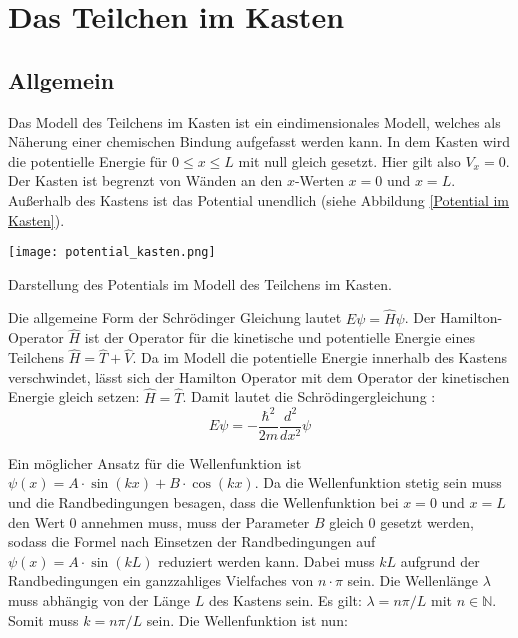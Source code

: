 \section{Das Teilchen im Kasten}

\subsection{Allgemein}

Das Modell des Teilchens im Kasten ist ein eindimensionales Modell, welches als Näherung einer chemischen Bindung aufgefasst werden kann. In dem Kasten wird die potentielle Energie für $ 0 \leq x \leq L $ mit null gleich gesetzt.
Hier gilt also $ V_x = 0 $. 
Der Kasten ist begrenzt von Wänden an den $ x $-Werten $ x = 0 $ und $ x=L $. Außerhalb des Kastens ist das Potential unendlich (siehe Abbildung \ref{Potential im Kasten}).


\begin{dsafigure}
 \centering
 \texttt{[image: potential\_kasten.png]}
 \caption{Darstellung des Potentials im Modell des Teilchens im Kasten.
\cite{wikiKastenpot}}
 \label{Potential im Kasten}
\end{dsafigure} 

Die allgemeine Form der Schrödinger Gleichung lautet $ E\psi=\hat{H}\psi $. Der Hamilton-Operator $ \hat{H} $ ist der Operator für die kinetische und potentielle Energie eines Teilchens $ \hat{H}=\hat{T}+\hat{V} $. Da im Modell die potentielle Energie innerhalb des Kastens verschwindet, lässt sich der Hamilton Operator mit dem Operator der kinetischen Energie gleich setzen: $ \hat{H}=\hat{T} $. Damit lautet die Schrödingergleichung \cite{Atkins2001}:
\begin{equation}
E \psi = - \dfrac{\hbar ^2}{2m} \dfrac{d^2}{dx^2}\psi  
\end{equation}
 

Ein möglicher Ansatz für die Wellenfunktion ist $ \psi (x) = A \cdot \sin (kx) + B \cdot \cos (kx) $. Da die Wellenfunktion stetig sein muss und die Randbedingungen besagen, dass die Wellenfunktion bei $ x=0 $ und $ x=L$  den Wert $0$ annehmen muss, muss der Parameter $ B $ gleich $0$ gesetzt werden, sodass die Formel nach Einsetzen der Randbedingungen auf $ \psi (x) = A \cdot \sin (kL) $ reduziert werden kann. Dabei muss $ kL $ aufgrund der Randbedingungen ein ganzzahliges Vielfaches von $ n\cdot\pi $ sein. Die Wellenlänge $\lambda $ muss abhängig von der Länge $ L $ des Kastens sein. Es gilt: $ \lambda = n\pi/L $ mit $ n \in \mathbb{N} $. Somit muss $ k=n\pi/L $ sein. Die Wellenfunktion ist nun:
 
